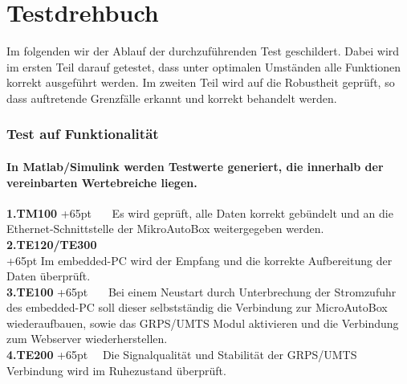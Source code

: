 \documentclass[fontsize = 12pt, paper = a4]{scrreprt}
\begin{document}








\chapter*{Testdrehbuch}
Im folgenden wir der Ablauf der durchzuführenden Test geschildert. Dabei wird im ersten Teil darauf getestet, dass unter optimalen Umständen alle Funktionen korrekt ausgeführt werden. Im zweiten Teil wird auf die Robustheit geprüft, so dass auftretende Grenzfälle erkannt und korrekt behandelt werden.


\subsection*{Test auf Funktionalität}
\subsubsection*{In Matlab/Simulink werden Testwerte generiert, die innerhalb der vereinbarten Wertebreiche liegen.} 



\textbf{1.TM100}
\hangindent+65pt 
\ \ \  Es wird geprüft, alle Daten korrekt gebündelt und an die Ethernet-Schnittstelle der MikroAutoBox weitergegeben werden. \\

\textbf{2.TE120/TE300}\\
\hangindent+65pt 
Im embedded-PC wird der Empfang und die korrekte Aufbereitung der Daten überprüft.\\

\textbf{3.TE100}
\hangindent+65pt  
\ \ \ Bei einem Neustart durch Unterbrechung der Stromzufuhr des embedded-PC soll dieser selbstständig die Verbindung zur MicroAutoBox wiederaufbauen, sowie das GRPS/UMTS Modul aktivieren und die Verbindung zum Webserver wiederherstellen.\\

\textbf{4.TE200}
\hangindent+65pt  
\ \  Die Signalqualität und Stabilität der GRPS/UMTS Verbindung wird im Ruhezustand überprüft.\\
\end{document}
